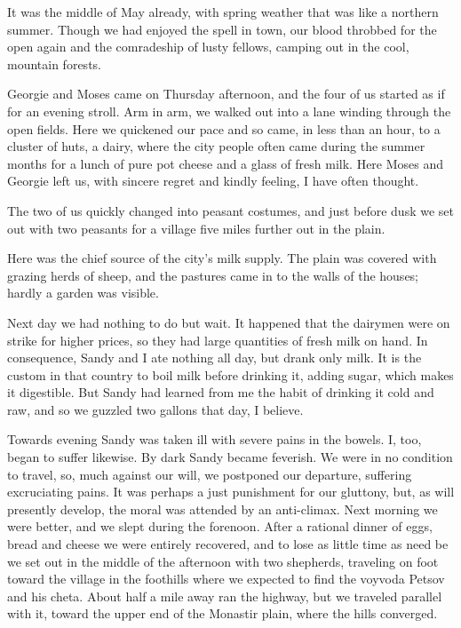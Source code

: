 \documentclass[a5paper,12pt]{book}
\begin{document}
It was the middle of May already, with spring weather that was like a northern summer. Though we had enjoyed the spell in town, our blood throbbed for the open again and the comradeship of lusty fellows, camping out in the cool, mountain forests. 

Georgie and Moses came on Thursday afternoon, and the four of us started as if for an evening stroll. Arm in arm, we walked out into a lane winding through the open fields. Here we quickened our pace and so came, in less than an hour, to a cluster of huts, a dairy, where the city people often came during the summer months for a lunch of pure pot cheese and a glass of fresh milk. Here Moses and Georgie left us, with sincere regret and kindly feeling, I have often thought. 

The two of us quickly changed into peasant costumes, and just before dusk we set out with two peasants for a village five miles further out in the plain. 

Here was the chief source of the city’s milk supply. The plain was covered with grazing herds of sheep, and the pastures came in to the walls of the houses; hardly a garden was visible. 

Next day we had nothing to do but wait. It happened that the dairymen were on strike for higher prices, so they had large quantities of fresh milk on hand. In consequence, Sandy and I ate nothing all day, but drank only milk. It is the custom in that country to boil milk before drinking it, adding sugar, which makes it digestible. But Sandy had learned from me the habit of drinking it cold and raw, and so we guzzled two gallons that day, I believe. 

Towards evening Sandy was taken ill with severe pains in the bowels. I, too, began to suffer likewise. By dark Sandy became feverish. We were in no condition to travel, so, much against our will, we postponed our departure, suffering excruciating pains. It was perhaps a just punishment for our gluttony, but, as will presently develop, the moral was attended by an anti-climax.
Next morning we were better, and we slept during the forenoon. After a rational dinner of eggs, bread and cheese we were entirely recovered, and to lose as little time as need be we set out in the middle of the afternoon with two shepherds, traveling on foot toward the village in the foothills where we expected to find the voyvoda Petsov and his cheta. About half a mile away ran the highway, but we traveled parallel with it, toward the upper end of the Monastir plain, where the hills converged.
\end{document}
